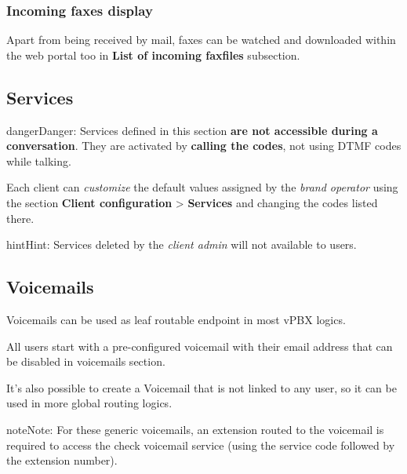 \documentclass[letterpaper,10pt,english]{sphinxmanual}
\begin{document}
\subsubsection{Incoming faxes display}
\label{administration_portal/client/vpbx/faxes:incoming-faxes-display}
Apart from being received by mail, faxes can be watched and downloaded within
the web portal too in \textbf{List of incoming faxfiles} subsection.
\label{administration_portal/client/vpbx/services:client-services}

\subsection{Services}
\label{administration_portal/client/vpbx/services:services}\label{administration_portal/client/vpbx/services:client-services}\label{administration_portal/client/vpbx/services::doc}\label{administration_portal/client/vpbx/services:id1}
\begin{notice}{danger}{Danger:}
Services defined in this section \textbf{are not accessible during a
conversation}. They are activated by \textbf{calling the codes}, not using
DTMF codes while talking.
\end{notice}

Each client can \emph{customize} the default values assigned by the \emph{brand operator}
using the section \textbf{Client configuration} \textgreater{} \textbf{Services} and changing the codes
listed there.

\begin{notice}{hint}{Hint:}
Services deleted by the \emph{client admin} will not available to users.
\end{notice}


\subsection{Voicemails}
\label{administration_portal/client/vpbx/voicemails:voicemails}\label{administration_portal/client/vpbx/voicemails::doc}\label{administration_portal/client/vpbx/voicemails:id1}
Voicemails can be used as leaf routable endpoint in most vPBX logics.

All users start with a pre-configured voicemail with their email address that can be disabled in voicemails section.

It's also possible to create a Voicemail that is not linked to any user, so it can be used in more global routing
logics.

\begin{notice}{note}{Note:}
For these generic voicemails, an extension routed to the voicemail is required to access the check voicemail
service (using the service code followed by the extension number).
\end{notice}
\end{document}
